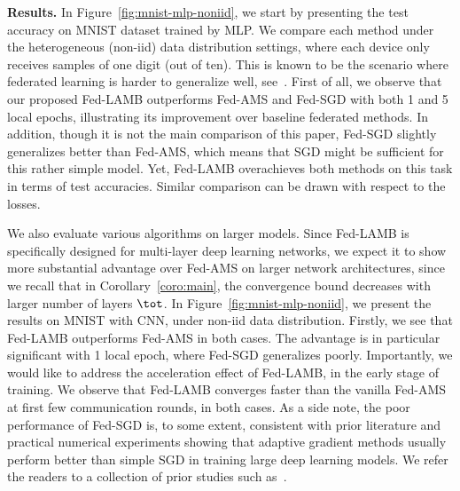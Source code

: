 \documentclass[11pt]{article}
\begin{document}
\vspace{0.05in}
\noindent\textbf{Results.}
In Figure~\ref{fig:mnist-mlp-noniid}, we start by presenting the test accuracy on MNIST dataset trained by MLP. 
We compare each method under the heterogeneous (non-iid) data distribution settings, where each device only receives samples of one digit (out of ten). 
This is known to be the scenario where federated learning is harder to generalize well, see~\citep{mcmahan2017communication}. 
First of all, we observe that our proposed Fed-LAMB outperforms Fed-AMS and Fed-SGD with both 1 and 5 local epochs, illustrating its improvement over baseline federated methods. 
In addition, though it is not the main comparison of this paper, Fed-SGD slightly generalizes better than Fed-AMS, which means that SGD might be sufficient for this rather simple model. 
Yet, Fed-LAMB overachieves both methods on this task in terms of test accuracies.
Similar comparison can be drawn with respect to the losses.



We also evaluate various algorithms on larger models. 
Since Fed-LAMB is specifically designed for multi-layer deep learning networks, we expect it to show more substantial advantage over Fed-AMS on larger network architectures, since we recall that in Corollary~\ref{coro:main}, the convergence bound decreases with larger number of layers $\tot$.
In Figure~\ref{fig:mnist-mlp-noniid}, we present the results on MNIST with CNN, under non-iid data distribution. Firstly, we see that Fed-LAMB outperforms Fed-AMS in both cases. The advantage is in particular significant with 1 local epoch, where Fed-SGD generalizes poorly. Importantly, we would like to address the acceleration effect of Fed-LAMB, in the early stage of training. We observe that Fed-LAMB converges faster than the vanilla Fed-AMS at first few communication rounds, in both cases. 
As a side note, the poor performance of Fed-SGD is, to some extent, consistent with prior literature and practical numerical experiments showing that adaptive gradient methods usually perform better than simple SGD in training large deep learning models. We refer the readers to a collection of prior studies such as~\citep{chen2020toward,reddi2020adaptive}. 
\end{document}
